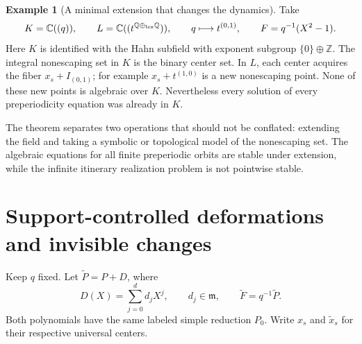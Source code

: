 \documentclass[11pt,a4paper]{article}
\numberwithin{equation}{section}
\theoremstyle{plain}
\theoremstyle{definition}
\newtheorem{example}[example]{Example}
\theoremstyle{remark}
\newcommand{\C}{\mathbb C}
\newcommand{\Q}{\mathbb Q}
\newcommand{\Z}{\mathbb Z}
\newcommand{\mm}{\mathfrak m}
\begin{document}
\begin{example}[A minimal extension that changes the dynamics]\label{epd:ex:minimal-extension}
Take
\[
 K=\C((q)),\qquad
 L=\C((t^{\Q\oplus_{\rm lex}\Q})),
 \qquad q\longmapsto t^{(0,1)},\qquad F=q^{-1}(X^2-1).
\]
Here $K$ is identified with the Hahn subfield with exponent subgroup
$\{0\}\oplus\Z$. The integral nonescaping set in $K$ is the binary
center set. In $L$, each center acquires the fiber $x_s+I_{(0,1)}$;
for example $x_s+t^{(1,0)}$ is a new nonescaping point. None of these
new points is algebraic over $K$. Nevertheless every solution of every
preperiodicity equation was already in $K$.
\end{example}

The theorem separates two operations that should not be conflated:
extending the field and taking a symbolic or topological model of the
nonescaping set. The algebraic equations for all finite preperiodic
orbits are stable under extension, while the infinite itinerary
realization problem is not pointwise stable.

\section{Support-controlled deformations and invisible changes}
\label{epd:sec:deformation}
Keep $q$ fixed. Let $\widetilde P=P+D$, where
\[
 D(X)=\sum_{j=0}^d d_jX^j,\qquad d_j\in\mm,
 \qquad \widetilde F=q^{-1}\widetilde P.
\]
Both polynomials have the same labeled simple reduction $P_0$.
Write $x_s$ and $\widetilde x_s$ for their respective universal
centers.
\end{document}
